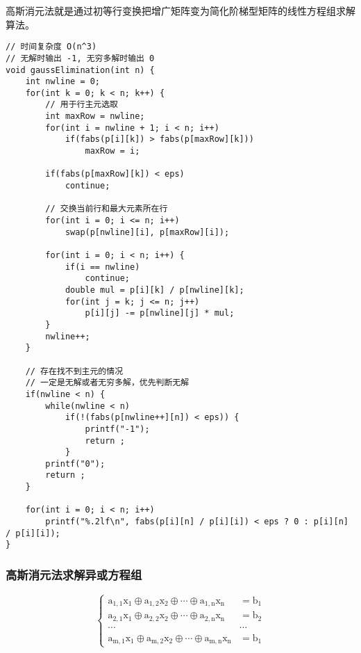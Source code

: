 \documentclass[UTF8]{article}
\begin{document}
高斯消元法就是通过初等行变换把增广矩阵变为简化阶梯型矩阵的线性方程组求解算法。
\begin{lstlisting}[caption=高斯消元法]
// 时间复杂度 O(n^3)
// 无解时输出 -1, 无穷多解时输出 0
void gaussElimination(int n) {
	int nwline = 0;
	for(int k = 0; k < n; k++) {
		// 用于行主元选取
		int maxRow = nwline;
		for(int i = nwline + 1; i < n; i++)
			if(fabs(p[i][k]) > fabs(p[maxRow][k]))
				maxRow = i;
		
		if(fabs(p[maxRow][k]) < eps)
			continue;
		
		// 交换当前行和最大元素所在行
		for(int i = 0; i <= n; i++)
			swap(p[nwline][i], p[maxRow][i]);
		
		for(int i = 0; i < n; i++) {
			if(i == nwline)
				continue;
			double mul = p[i][k] / p[nwline][k];
			for(int j = k; j <= n; j++)
				p[i][j] -= p[nwline][j] * mul;
		}
		nwline++;
	}
	
	// 存在找不到主元的情况
	// 一定是无解或者无穷多解，优先判断无解
	if(nwline < n) {
		while(nwline < n) 
			if(!(fabs(p[nwline++][n]) < eps)) {
				printf("-1");
				return ;
			}
		printf("0");
		return ;
	}
	
	for(int i = 0; i < n; i++)
		printf("%.2lf\n", fabs(p[i][n] / p[i][i]) < eps ? 0 : p[i][n] / p[i][i]);
}
\end{lstlisting}


\subsubsection{高斯消元法求解异或方程组}
$$
\mathrm{\begin{cases}a_{1,1} x_1 \oplus a_{1,2} x_2 \oplus \cdots \oplus a_{1, n} x_n & =b_1 \\ a_{2,1} x_1 \oplus a_{2,2} x_2 \oplus \cdots \oplus a_{2, n} x_n & =b_2 \\ \cdots & \cdots \\ a_{m, 1} x_1 \oplus a_{m, 2} x_2 \oplus \cdots \oplus a_{m, n} x_n & =b_1\end{cases}}
$$
\end{document}
